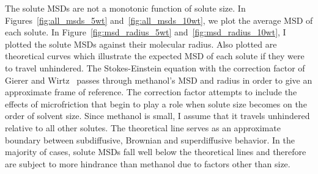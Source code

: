 \documentclass{article}
\begin{document}
  
  The solute MSDs are not a monotonic function of solute size. In 
  Figures~\ref{fig:all_msds_5wt} and~\ref{fig:all_msds_10wt}, we plot
  the average MSD of each solute. In Figure~\ref{fig:msd_radius_5wt} 
  and~\ref{fig:msd_radius_10wt}, I plotted the solute MSDs against their
  molecular radius. Also plotted are theoretical curves which illustrate the 
  expected MSD of each solute if they were to travel unhindered. The 
  Stokes-Einstein equation with the correction factor of Gierer and 
  Wirtz~\cite{gierer_molekulare_1953} passes through methanol's MSD and
  radius in order to give an approximate frame of reference. The correction 
  factor attempts to include the effects of microfriction that begin to 
  play a role when solute size becomes on the order of solvent size. 
  Since methanol is small, I assume that it travels unhindered relative 
  to all other solutes. The theoretical line serves as an approximate 
  boundary between subdiffusive, Brownian and superdiffusive behavior.
  In the majority of cases, solute MSDs fall well below the theoretical
  lines and therefore are subject to more hindrance than methanol due to
  factors other than size.
\end{document}
